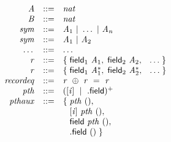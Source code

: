 $$
\begin{array}{@{}lrrl@{}l@{}}
& {\mathit{A}} &::=& {\mathit{nat}} \\
& {\mathit{B}} &::=& {\mathit{nat}} \\
& {\mathit{sym}} &::=& {\mathit{A}}_{{1}} ~|~ \dots ~|~ {\mathit{A}}_{{\mathit{n}}} \\
& {\mathit{sym}} &::=& {\mathit{A}}_{{1}} ~|~ {\mathit{A}}_{{2}} \\
& \dots &::=& \dots \\
& {\mathit{r}} &::=& \{\; \begin{array}[t]{@{}l@{}l@{}}
{\mathsf{field}}_{1}~{\mathit{A}}_{{1}},\; {\mathsf{field}}_{2}~{\mathit{A}}_{{2}},\; {}~\dots \;\}\end{array} \\
& {\mathit{r}} &::=& \{\; \begin{array}[t]{@{}l@{}l@{}}
{\mathsf{field}}_{1}~{{\mathit{A}}_{{1}}^\ast},\; {\mathsf{field}}_{2}~{{\mathit{A}}_{{2}}^\ast},\; {}~\dots \;\}\end{array} \\
& {\mathit{recordeq}} &::=& {\mathit{r}}~\oplus~{\mathit{r}}~=~{\mathit{r}} \\
& {\mathit{pth}} &::=& {({}[{\mathit{i}}]~\mid~{}.\mathsf{field})^{+}} \\
& {\mathit{pthaux}} &::=& \{\; \begin{array}[t]{@{}l@{}l@{}}
{\mathit{pth}}~(),\; \\
  {}[{\mathit{i}}]~{\mathit{pth}}~(),\; \\
  \mathsf{field}~{\mathit{pth}}~(),\; \\
  {}.\mathsf{field}~() \;\}\end{array} \\
\end{array}
$$

